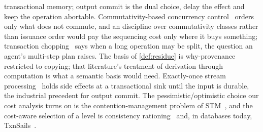 transactional memory; output commit is the dual choice, delay the effect and
keep the operation abortable. Commutativity-based concurrency
control~\cite{Weihl1988Commutativity} orders only what does not commute, and
an  discipline over commutativity classes rather than issuance order
would pay the sequencing cost only where it buys something; transaction
chopping~\cite{ShashaEtAl1995Chopping} says when a long operation may be
split, the question an agent's multi-step plan raises. The basis of \cref{def:residue} is
why-provenance~\cite{BunemanEtAl2001Why,GreenEtAl2007Semirings} restricted
to copying; that literature's treatment of derivation through computation
is what a semantic basis would need. Exactly-once stream
processing~\cite{AkidauEtAl2013MillWheel,CarboneEtAl2017Flink} holds
side effects at a transactional sink until the input is durable, the
industrial precedent for output commit. The pessimistic/optimistic choice our cost
analysis turns on is the contention-management problem of
STM~\cite{GuerraouiHerlihyPochon2005,SchererScott2005}, and the cost-aware
selection of a level is consistency
rationing~\cite{KraskaEtAl2009Rationing} and, in databases today,
TxnSails~\cite{ZhouEtAl2025TxnSails}.

